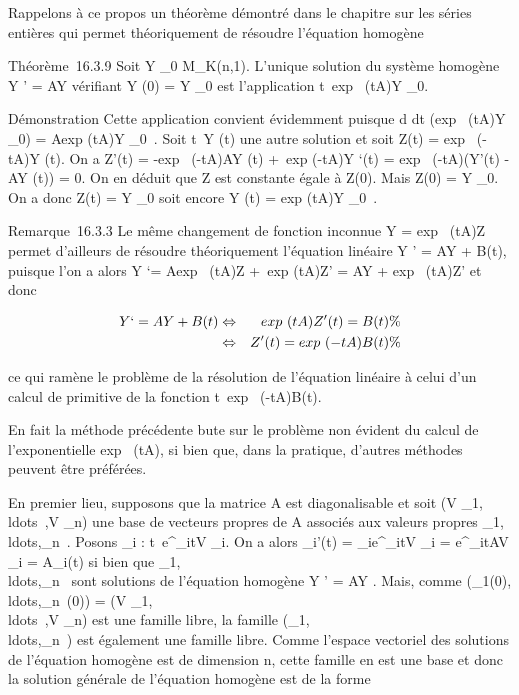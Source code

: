 \documentclass[]{article}
\begin{document}
Rappelons à ce propos un théorème démontré dans le chapitre sur les
séries entières qui permet théoriquement de résoudre l'équation homogène

Théorème~16.3.9 Soit Y _0 \in M_K(n,1). L'unique
solution du système homogène Y ' = AY vérifiant Y (0) = Y _0
est l'application
t\mapsto~exp~ (tA)Y
_0.

Démonstration Cette application convient évidemment puisque  d
\over dt (exp~ (tA)Y
_0) = Aexp (tA)Y _0~. Soit
t\mapsto~Y (t) une autre solution et soit Z(t)
= exp~ (-tA)Y (t). On a Z'(t) =
-exp~ (-tA)AY (t) +\
exp (-tA)Y `(t) = exp~ (-tA)(Y'(t) - AY (t))
= 0. On en déduit que Z est constante égale à Z(0). Mais Z(0) = Y
_0. On a donc Z(t) = Y _0 soit encore Y (t)
= exp (tA)Y _0~.

Remarque~16.3.3 Le même changement de fonction inconnue Y
= exp~ (tA)Z permet d'ailleurs de résoudre
théoriquement l'équation linéaire Y ' = AY + B(t), puisque l'on a alors
Y `= Aexp~ (tA)Z +\
exp (tA)Z' = AY + exp~ (tA)Z' et donc

\begin{align*} Y `= AY + B(t)&
\Leftrightarrow & exp~ (tA)Z'(t)
= B(t) \%& \\ &
\Leftrightarrow & Z'(t) = exp~
(-tA)B(t)\%& \\
\end{align*}

ce qui ramène le problème de la résolution de l'équation linéaire à
celui d'un calcul de primitive de la fonction
t\mapsto~exp~ (-tA)B(t).

En fait la méthode précédente bute sur le problème non évident du calcul
de l'exponentielle exp~ (tA), si bien que, dans
la pratique, d'autres méthodes peuvent être préférées.

En premier lieu, supposons que la matrice A est diagonalisable et soit
(V
_1,\\ldots~,V
_n) une base de vecteurs propres de A associés aux valeurs
propres
\lambda_1,\\ldots,\lambda_n~.
Posons \Phi_i :
t\mapsto~e^\lambda_itV _i. On
a alors \Phi_i'(t) = \lambda_ie^\lambda_itV
_i = e^\lambda_itAV _i = A\Phi_i(t)
si bien que
\Phi_1,\\ldots,\Phi_n~
sont solutions de l'équation homogène Y ' = AY . Mais, comme
(\Phi_1(0),\\ldots,\Phi_n~(0))
= (V
_1,\\ldots~,V
_n) est une famille libre, la famille
(\Phi_1,\\ldots,\Phi_n~)
est également une famille libre. Comme l'espace vectoriel des solutions
de l'équation homogène est de dimension n, cette famille en est une base
et donc la solution générale de l'équation homogène est de la forme
\end{document}
